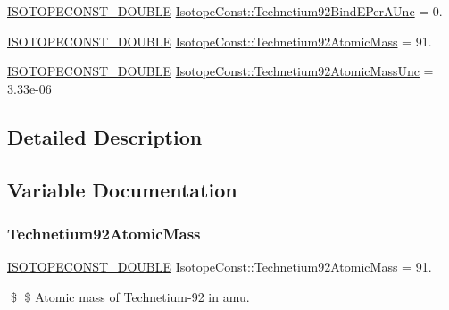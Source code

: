 \begin{DoxyCompactItemize}
\mbox{\hyperlink{group___isotope_const-_macros_ga8f45a7272ce02c0b4c65c44636ed719a}{I\+S\+O\+T\+O\+P\+E\+C\+O\+N\+S\+T\+\_\+\+D\+O\+U\+B\+LE}} \mbox{\hyperlink{group___isotope_const-_technetium-_tc92_ga012e3580eb680e157d3424c79e01028e}{Isotope\+Const\+::\+Technetium92\+Bind\+E\+Per\+A\+Unc}} = 0.
\item 
\mbox{\hyperlink{group___isotope_const-_macros_ga8f45a7272ce02c0b4c65c44636ed719a}{I\+S\+O\+T\+O\+P\+E\+C\+O\+N\+S\+T\+\_\+\+D\+O\+U\+B\+LE}} \mbox{\hyperlink{group___isotope_const-_technetium-_tc92_ga0a0229d09c45ed410005602e30926029}{Isotope\+Const\+::\+Technetium92\+Atomic\+Mass}} = 91.
\item 
\mbox{\hyperlink{group___isotope_const-_macros_ga8f45a7272ce02c0b4c65c44636ed719a}{I\+S\+O\+T\+O\+P\+E\+C\+O\+N\+S\+T\+\_\+\+D\+O\+U\+B\+LE}} \mbox{\hyperlink{group___isotope_const-_technetium-_tc92_gacb3c2fb717c10e4462a43152d1884753}{Isotope\+Const\+::\+Technetium92\+Atomic\+Mass\+Unc}} = 3.\+33e-\/06
\end{DoxyCompactItemize}


\subsection{Detailed Description}


\subsection{Variable Documentation}
\mbox{\label{group___isotope_const-_technetium-_tc92_ga0a0229d09c45ed410005602e30926029}} 
\subsubsection{\texorpdfstring{Technetium92\+Atomic\+Mass}{Technetium92AtomicMass}}
{\footnotesize\ttfamily \mbox{\hyperlink{group___isotope_const-_macros_ga8f45a7272ce02c0b4c65c44636ed719a}{I\+S\+O\+T\+O\+P\+E\+C\+O\+N\+S\+T\+\_\+\+D\+O\+U\+B\+LE}} Isotope\+Const\+::\+Technetium92\+Atomic\+Mass = 91.}

\$ \$ Atomic mass of Technetium-\/92 in amu. \mbox{\label{group___isotope_const-_technetium-_tc92_gacb3c2fb717c10e4462a43152d1884753}} 
